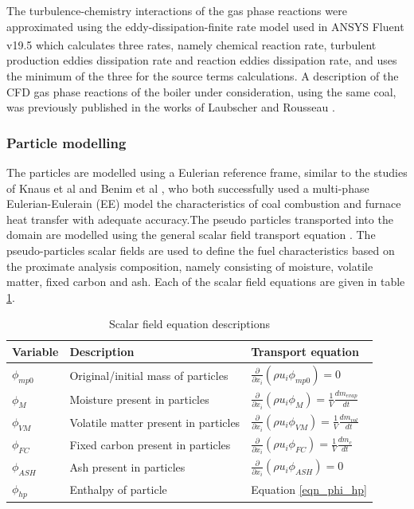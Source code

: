\documentclass[review]{elsarticle}
\begin{document}
The turbulence-chemistry interactions of the gas phase reactions were approximated using the eddy-dissipation-finite rate model used in ANSYS Fluent v19.5\textsuperscript{\textregistered} which calculates three rates, namely chemical reaction rate, turbulent production eddies dissipation rate and reaction eddies dissipation rate, and uses the minimum of the three for the source terms calculations. A description of the CFD gas phase reactions of the boiler under consideration, using the same coal, was previously published in the works of Laubscher and Rousseau \cite{Laubscher2019b}.

\subsubsection{Particle modelling}
The particles are modelled using a Eulerian reference frame, similar to the studies of Knaus et al \cite{Knaus2001a} and Benim et al \cite{Benim2005}, who both successfully used a multi-phase Eulerian-Eulerain (EE) model the characteristics of coal combustion and furnace heat transfer with adequate accuracy.The pseudo particles transported into the domain are modelled using the general scalar field transport equation \cite{Versteeg2007}. The pseudo-particles scalar fields are used to define the fuel characteristics based on the proximate analysis composition, namely consisting of moisture, volatile matter, fixed  carbon and ash. Each of the scalar field equations are given in table \ref{tab_scalars}.

\begin{table}[h!]
\centering
\caption{Scalar field equation descriptions}\label{tab_scalars}       
\begin{tabular}{lll}
\hline
Variable &Description& Transport equation \\
\hline
$\phi_{mp0}$ &Original/initial mass of particles& $\frac{\partial}{\partial x_{i}}(\rho u_{i} \phi_{mp0})=0$\\
$\phi_{M}$&Moisture present in particles&$\frac{\partial}{\partial x_{i}}(\rho u_{i} \phi_{M})=\frac{1}{V} \frac{dm_{evap}}{dt}$\\
$\phi_{VM}$&Volatile matter present in particles&  $\frac{\partial}{\partial x_{i}}(\rho u_{i} \phi_{VM})=\frac{1}{V}\frac{dm_{vol}}{dt}$\\
$\phi_{FC}$&Fixed carbon present in particles&$\frac{\partial}{\partial x_{i}}(\rho u_{i} \phi_{FC})=\frac{1}{V}\frac{dm_c}{dt}$\\
$\phi_{ASH}$&Ash present in particles&$\frac{\partial}{\partial x_{i}}(\rho u_{i} \phi_{ASH})=0$\\
$\phi_{hp}$&Enthalpy of particle&Equation \eqref{eqn_phi_hp}\\
\hline
\end{tabular}
\end{table}
\end{document}
